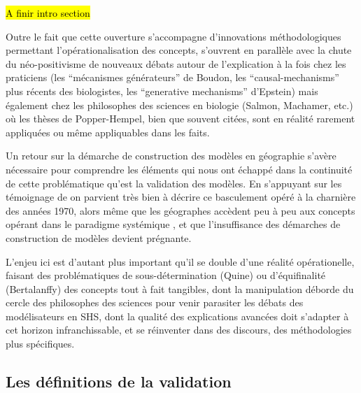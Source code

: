\hl{ A finir intro section}


Outre le fait que cette ouverture s'accompagne d'innovations méthodologiques permettant l'opérationalisation des concepts, s'ouvrent en parallèle avec la chute du néo-positivisme de nouveaux débats autour de l'explication \autocite{Hedstrom2010} à la fois chez les praticiens (les \enquote{mécanismes générateurs} de Boudon, les \foreignquote{english}{causal-mechanisms} plus récents des biologistes, les \foreignquote{english}{generative mechanisms} d'Epstein) mais également chez les philosophes des sciences en biologie (Salmon, Machamer, etc.) où les thèses de Popper-Hempel, bien que souvent citées, sont en réalité rarement appliquées ou même appliquables dans les faits. \autocite{Bechet2013}

Un retour sur la démarche de construction des modèles en géographie s'avère nécessaire pour comprendre les éléments qui nous ont échappé dans la continuité de cette problématique qu'est la validation des modèles. En s'appuyant sur les témoignage de \autocite{Batty2001, Pumain2003} on parvient très bien à décrire ce basculement opéré à la charnière des années 1970, alors même que les géographes accèdent peu à peu aux concepts opérant dans le paradigme systémique \autocite{Harvey1969}, et que l'insuffisance des démarches de construction de modèles devient prégnante.

L'enjeu ici est d'autant plus important qu'il se double d'une réalité opérationelle, faisant des problématiques de sous-détermination (Quine) ou d'équifinalité (Bertalanffy) des concepts tout à fait tangibles, dont la manipulation déborde du cercle des philosophes des sciences pour venir parasiter les débats des modélisateurs en SHS, dont la qualité des explications avancées doit s'adapter à cet horizon infranchissable, et se réinventer dans des discours, des méthodologies plus spécifiques.

\subsection{Les définitions de la validation}
\label{ssec:def_generique_validation}

